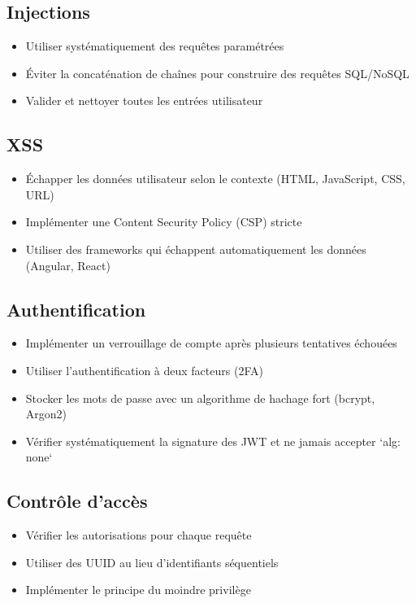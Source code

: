 \documentclass[12pt,a4paper]{report}
\begin{document}
\subsection{Injections}
\begin{itemize}
    \item Utiliser systématiquement des requêtes paramétrées
    \item Éviter la concaténation de chaînes pour construire des requêtes SQL/NoSQL
    \item Valider et nettoyer toutes les entrées utilisateur
\end{itemize}

\subsection{XSS}
\begin{itemize}
    \item Échapper les données utilisateur selon le contexte (HTML, JavaScript, CSS, URL)
    \item Implémenter une Content Security Policy (CSP) stricte
    \item Utiliser des frameworks qui échappent automatiquement les données (Angular, React)
\end{itemize}

\subsection{Authentification}
\begin{itemize}
    \item Implémenter un verrouillage de compte après plusieurs tentatives échouées
    \item Utiliser l'authentification à deux facteurs (2FA)
    \item Stocker les mots de passe avec un algorithme de hachage fort (bcrypt, Argon2)
    \item Vérifier systématiquement la signature des JWT et ne jamais accepter `alg: none`
\end{itemize}

\subsection{Contrôle d'accès}
\begin{itemize}
    \item Vérifier les autorisations pour chaque requête
    \item Utiliser des UUID au lieu d'identifiants séquentiels
    \item Implémenter le principe du moindre privilège
\end{itemize}
\end{document}
